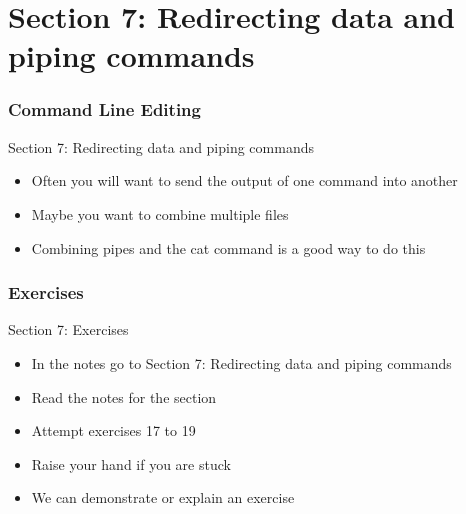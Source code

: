 \part{Section 7: Redirecting data and piping commands}
\begin{frame}
\partpage
\end{frame}

\section{Command Line Editing}
\begin{frame}{Section 7: Redirecting data and piping commands}
\begin{itemize}
\item Often you will want to send the output of one command into another
\item Maybe you want to combine multiple files
\item Combining pipes and the cat command is a good way to do this
\end{itemize}
\end{frame}


\section{Exercises}
\begin{frame}{Section 7: Exercises}
\begin{itemize}
\item In the notes go to {Section 7: Redirecting data and piping commands}
\item Read the notes for the section 
\item Attempt exercises 17 to 19
\item Raise your hand if you are stuck
\item We can demonstrate or explain an exercise
\end{itemize}
\end{frame}


